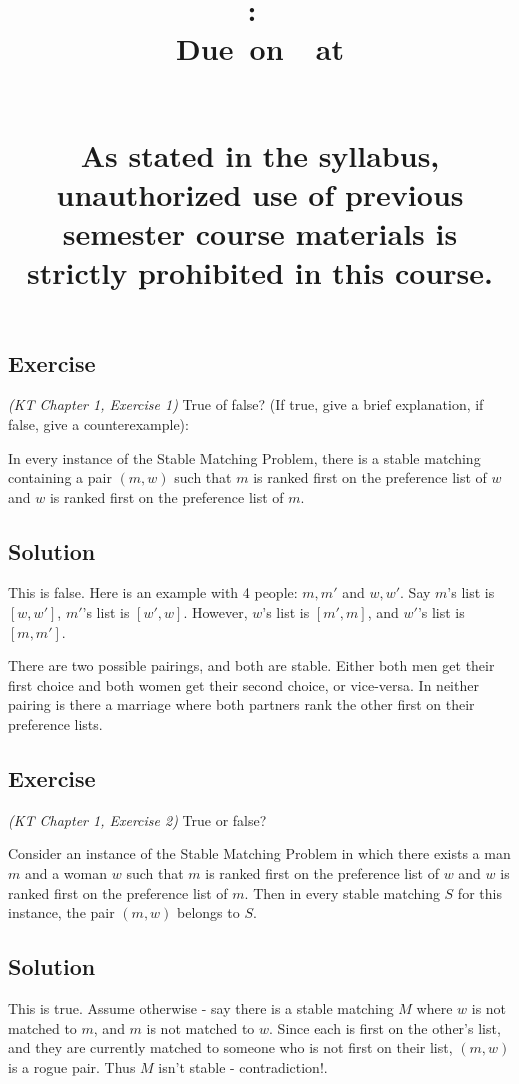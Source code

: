 \documentclass{article}
\title{
    \vspace{2in}
    \textbf{\hmwkClass:\ \hmwkTitle}\\
    \normalsize\vspace{0.1in}\small{Due\ on\ \hmwkDueDate\ at \hmwkDueTime}\\
    \vspace{0.1in}\large{\textit{\hmwkClassInstructor\ \hmwkSection}} \\
    \vspace{0.8in}
    \begin{minipage}[t]{0.4\columnwidth}
        {\footnotesize\textbf{As stated in the syllabus, unauthorized use of previous semester course materials is strictly prohibited in this course.
        }}
    \vspace{0.5in}
    \end{minipage}
    \vspace{0.8in}
    \author{\textbf{\hmwkAuthorName}}
    \date{}
}
\newcounter{counter}
\newcommand{\Exercise}{Exercise \stepcounter{counter}\thecounter}
\begin{document}
\maketitle
\pagebreak


\subsection*{\Exercise}
    \textit{(KT Chapter 1, Exercise 1)} True of false?  (If true, give a brief explanation, if false, give a counterexample): 
    
    In every instance of the Stable Matching Problem, there is a stable matching containing a pair $(m, w)$ such that $m$ is ranked first on the preference list of $w$ and $w$ is ranked first on the preference list of $m$.

\subsection*{Solution}
    This is false. Here is an example with 4 people: $m,m'$ and
    $w,w'$. Say $m$'s list is $[w,w']$, $m'$'s list is $[w',w]$. However, $w$'s list is $[m',m]$, and $w'$'s list is $[m,m']$.

    \vspace{2mm}
    There are two possible pairings, and both are stable. Either both men get their first choice and both women get their second choice, or vice-versa. In neither pairing is there a marriage where both partners rank the other first on their preference lists. 

\subsection*{\Exercise}
    \textit{(KT Chapter 1, Exercise 2)} True or false?
    
    Consider an instance of the Stable Matching Problem in which there exists a man $m$ and a woman $w$ such that $m$ is ranked first on the preference list of $w$ and $w$ is ranked first on the preference list of $m$.  Then in every stable matching $S$ for this instance, the pair $(m, w)$ belongs to $S$.

\subsection*{Solution}
    This is true. Assume otherwise - say there is a stable matching $M$ where $w$ is not matched to $m$, and $m$ is not matched to $w$. Since each is first on the other's list, and they are currently matched to someone who is not first on their list, $(m,w)$ is a rogue pair. Thus $M$ isn't stable - contradiction!.
\end{document}
